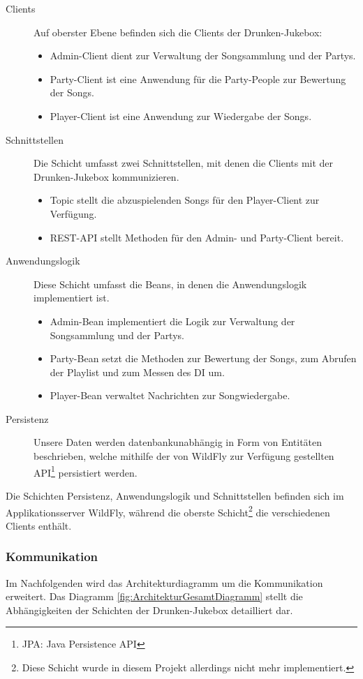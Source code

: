\begin{description}
\item [Clients] Auf oberster Ebene befinden sich die Clients der Drunken-Jukebox:
	\begin{itemize}
	\item Admin-Client dient zur Verwaltung der Songsammlung und der Partys.
	\item Party-Client ist eine Anwendung für die Party-People zur Bewertung der Songs.
	\item Player-Client ist eine Anwendung zur Wiedergabe der Songs.
	\end{itemize}
\item [Schnittstellen] Die Schicht umfasst zwei Schnittstellen, mit denen die Clients mit der Drunken-Jukebox kommunizieren.
	\begin{itemize}
	\item Topic stellt die abzuspielenden Songs für den Player-Client zur Verfügung.
	\item REST-API stellt Methoden für den Admin- und Party-Client bereit.
	\end{itemize}
\item [Anwendungslogik]Diese Schicht umfasst die Beans, in denen die Anwendungslogik implementiert ist.
	\begin{itemize}
	\item Admin-Bean implementiert die Logik zur Verwaltung der Songsammlung und der Partys.
	\item Party-Bean setzt die Methoden zur Bewertung der Songs, zum Abrufen der Playlist und zum Messen des DI um.
	\item Player-Bean verwaltet Nachrichten zur Songwiedergabe.
	\end{itemize}
\item [Persistenz] Unsere Daten werden datenbankunabhängig in Form von Entitäten beschrieben, welche mithilfe der von WildFly zur Verfügung gestellten API\footnote{JPA: Java Persistence API} persistiert werden.
\end{description}

Die Schichten Persistenz, Anwendungslogik und Schnittstellen befinden sich im Applikationsserver WildFly, während die oberste Schicht\footnote{Diese Schicht wurde in diesem Projekt allerdings nicht mehr implementiert.} die verschiedenen Clients enthält.

\newpage
\subsubsection{Kommunikation}
Im Nachfolgenden wird das Architekturdiagramm um die Kommunikation erweitert. Das Diagramm \ref{fig:ArchitekturGesamtDiagramm} stellt die Abhängigkeiten der Schichten der Drunken-Jukebox detailliert dar.

